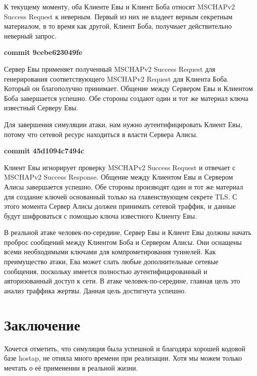 \documentclass[oneside, final, 14pt]{extarticle}
\begin{document}
К текущему моменту, оба Клиенте Евы и Клиент Боба относят MSCHAPv2 Success
Request к неверным. Первый из них не владеет верным секретным материалом,
в то время как другой, Клиент Боба, получиает действительно неверный
запрос.

\textbf{commit 9cebe623049fe}

Сервер Евы применяет полученный MSCHAPv2 Success Request
для генерирования соответствующего MSCHAPv2 Request для Клиента Боба.
Который он благополучно принимает.
Общение между Сервером Евы и Клиентом Боба завершается успешно.
Обе стороны создают один и тот же материал ключа
известный Серверу Евы.

Для завершения симуляции атаки, нам нужно аутентифицировать
Клиент Евы,
потому что сетевой ресурс находиться в власти Сервера Алисы.

\textbf{commit 45d1094c7494c}

Клиент Евы игнорирует проверку MSCHAPv2 Success Request
и отвечает с MSCHAPv2 Success Response.
Общение между Клиентом Евы и Сервером Алисы
завершается успешно. Обе стороны производят
один и тот же материал для создание ключей
основанный только на главенствующем секрете TLS.
С этого момента Сервер Алисы должен принимать
сетевой траффик, и данные будут шифроваться с помощью
ключа известного Клиенту Евы.

В реальной атаке человек-по-середине, Сервер Евы
и Клиент Евы должны начать проброс сообщений между Клиентом Боба
и Сервером Алисы.
Они оснащены всеми необходимыми ключами для компрометирования
туннелей.
Как преимущество атаки,
Ева может слать любые дополнительные сетевые сообщения,
поскольку имеется полностью аутентифицированный и авторизованный
доступ к сети.
В атаке человек-по-середине, главная цель это анализ траффика жертвы.
Данная цель достигнута успешно.

\cleardoublepage

\section{Заключение}
Хочется отметить, что симуляция была успешной
и благодяра хорошей кодовой базе hostap,
не отняла много времени при реализации.
Хотя мы можем только мечтать о её применении в реальной жизни.

\cleardoublepage

\end{document}
